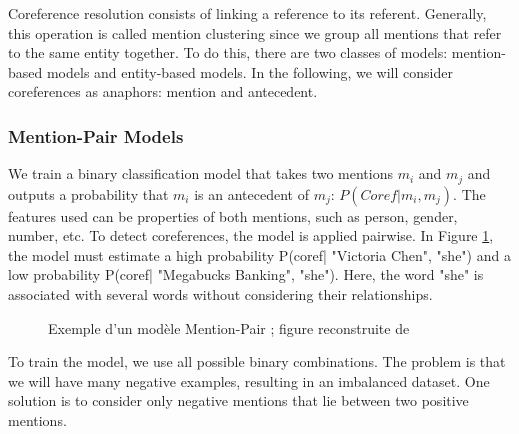 \documentclass{KBook}
\begin{document}
Coreference resolution consists of linking a reference to its referent. 
Generally, this operation is called mention clustering since we group all mentions that refer to the same entity together. 
To do this, there are two classes of models: mention-based models and entity-based models. 
In the following, we will consider coreferences as anaphors: mention and antecedent.

\subsubsection{Mention-Pair Models}

We train a binary classification model that takes two mentions $m_i$ and $m_j$ and outputs a probability that $m_i$ is an antecedent of $m_j$: $P(Coref|m_i, m_j)$. 
The features used can be properties of both mentions, such as person, gender, number, etc.
To detect coreferences, the model is applied pairwise.
In Figure \ref{fig:mention-pair-exp}, the model must estimate a high probability P(coref| "Victoria Chen", "she") and a low probability P(coref| "Megabucks Banking", "she").
Here, the word "she" is associated with several words without considering their relationships.

\begin{figure}[ht]
	\centering
	\caption[Exemple d'un modèle Mention-Pair]{Exemple d'un modèle Mention-Pair ; figure reconstruite de \cite{2019-jurafsky-martin}}
	\label{fig:mention-pair-exp}
\end{figure}

To train the model, we use all possible binary combinations. 
The problem is that we will have many negative examples, resulting in an imbalanced dataset. 
One solution is to consider only negative mentions that lie between two positive mentions.
\end{document}

